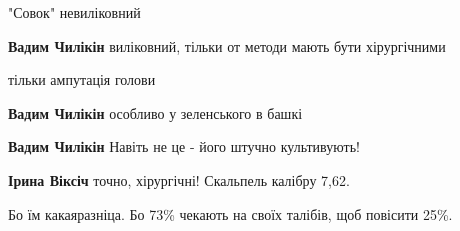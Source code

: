 \begin{itemize}
"Совок" невиліковний

\begin{itemize}
 
\textbf{Вадим Чилікін} виліковний, тільки от методи мають бути хірургічними

 
тільки ампутація голови

 
\textbf{Вадим Чилікін} особливо у зеленського в башкі

 
\textbf{Вадим Чилікін} Навіть не це - його штучно культивують!

 
\textbf{Ірина Віксіч} точно, хірургічні! Скальпель калібру 7,62.
\end{itemize}

 
Бо їм какаяразніца. Бо 73\% чекають на своїх талібів, щоб повісити 25\%.

 


\end{itemize}
